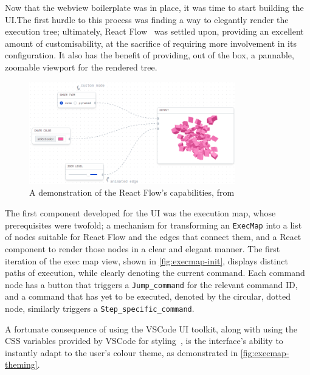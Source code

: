 Now that the webview boilerplate was in place, it was time to start building the
UI.\@ The first hurdle to this process was finding a way to elegantly render
the execution tree; ultimately, React Flow~\cite{react-flow} was settled upon,
providing an excellent amount of customisability, at the sacrifice of requiring
more involvement in its configuration. It also has the benefit of providing,
out of the box, a pannable, zoomable viewport for the rendered tree.

\begin{figure}
  \center{}
  \includegraphics[width=0.8\textwidth]{img/react-flow-demo.png}
  \caption{
    A demonstration of the React Flow's capabilities,
    from~\cite{react-flow}}%
  \label{fig:react-flow}
\end{figure}

The first component developed for the UI was the execution map, whose
prerequisites were twofold; a mechanism for transforming an \texttt{ExecMap}
into a list of nodes suitable for React Flow and the edges that connect them,
and a React component to render those nodes in a clear and elegant manner. The
first iteration of the exec map view, shown in \autoref{fig:execmap-init},
displays distinct paths of execution, while clearly denoting the current
command. Each command node has a button that triggers a \texttt{Jump\_command}
for the relevant command ID, and a command that has yet to be executed, denoted
by the circular, dotted node, similarly triggers a
\texttt{Step\_specific\_command}.

A fortunate consequence of using the VSCode UI toolkit, along with using the CSS
variables provided by VSCode for styling~\cite{vscode-theme}, is the interface's
ability to instantly adapt to the user's colour theme, as demonstrated in
\autoref{fig:execmap-theming}.

